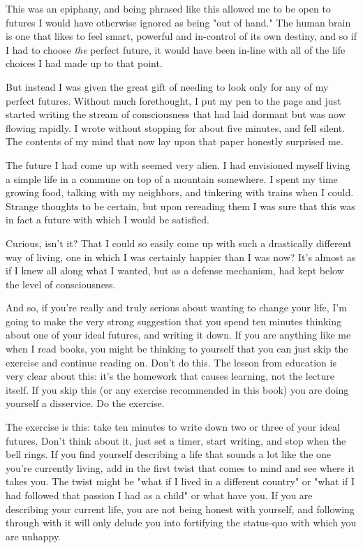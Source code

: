 \documentclass[]{book}
\begin{document}
This was an epiphany, and being phrased like this allowed me to be open to
futures I would have otherwise ignored as being "out of hand." The human brain
is one that likes to feel smart, powerful and in-control of its own destiny, and
so if I had to choose \emph{the} perfect future, it would have been in-line
with all of the life choices I had made up to that point.

But instead I was given the great gift of needing to look only for any of my
perfect futures. Without much forethought, I put my pen to the page and just
started writing the stream of consciousness that had laid dormant but was now
flowing rapidly. I wrote without stopping for about five minutes, and fell
silent. The contents of my mind that now lay upon that paper honestly surprised
me.

The future I had come up with seemed very alien. I had envisioned myself living
a simple life in a commune on top of a mountain somewhere. I spent my time
growing food, talking with my neighbors, and tinkering with trains when I could.
Strange thoughts to be certain, but upon rereading them I was sure that this was
in fact a future with which I would be satisfied.

Curious, isn't it? That I could so easily come up with such a drastically
different way of living, one in which I was certainly happier than I was now?
It's almost as if I knew all along what I wanted, but as a defense mechanism,
had kept below the level of consciousness.

And so, if you're really and truly serious about wanting to change your life,
I'm going to make the very strong suggestion that you spend ten minutes thinking
about one of your ideal futures, and writing it down. If you are anything like
me when I read books, you might be thinking to yourself that you can just skip
the exercise and continue reading on. Don't do this. The lesson from education
is very clear about this: it's the homework that causes learning, not the
lecture itself. If you skip this (or any exercise recommended in this book) you
are doing yourself a disservice. Do the exercise.

The exercise is this: take ten minutes to write down two or three of your ideal
futures. Don't think about it, just set a timer, start writing, and stop when
the bell rings. If you find yourself describing a life that sounds a lot like
the one you're currently living, add in the first twist that comes to mind and
see where it takes you. The twist might be "what if I lived in a different
country" or "what if I had followed that passion I had as a child" or what have
you. If you are describing your current life, you are not being honest with
yourself, and following through with it will only delude you into fortifying the
status-quo with which you are unhappy.
\end{document}
